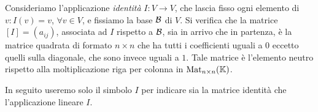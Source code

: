 \begin{observation}
	Consideriamo l'applicazione \emph{identità} $I : V \rightarrow V$, che lascia fisso ogni elemento di
	$v: I(v) = v$, $\forall v \in V$, e fissiamo la base $\mathcal{B}$ di $V$. Si verifica che la matrice
	$[I] = (a_{ij})$, associata ad $I$ rispetto a $\mathcal{B}$, sia in arrivo che in partenza, è la matrice
	quadrata di formato $n \times n$ che ha tutti i coefficienti uguali a $0$ eccetto quelli sulla diagonale,
	che sono invece uguali a $1$.  Tale matrice è l'elemento neutro rispetto alla moltiplicazione riga per
	colonna in $\operatorname{Mat}_{n \times n}(\mathbb{K})$.

	In seguito useremo solo il simbolo $I$ per indicare sia la matrice identità che	l'applicazione lineare
	$I$.
\end{observation}